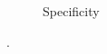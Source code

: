 \begin{figure}[htbp]
\begin{subfigure}[b]{0.48\textwidth}
    \caption{Specificity}
    \label{fig:gli-red-spec}
  \end{subfigure}
  \caption{.}
  \label{fig:gli-men-gliored}
\end{figure}


